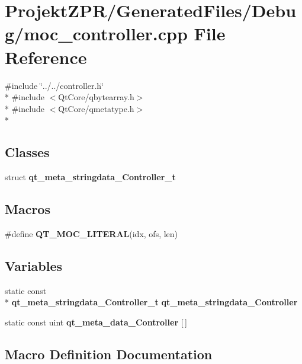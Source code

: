 \section{Projekt\-Z\-P\-R/\-Generated\-Files/\-Debug/moc\-\_\-controller.cpp File Reference}
\label{_debug_2moc__controller_8cpp}
{\ttfamily \#include \char`\"{}../../controller.\-h\char`\"{}}\\*
{\ttfamily \#include $<$Qt\-Core/qbytearray.\-h$>$}\\*
{\ttfamily \#include $<$Qt\-Core/qmetatype.\-h$>$}\\*
\subsection*{Classes}
\begin{DoxyCompactItemize}
\item 
struct {\bf qt\-\_\-meta\-\_\-stringdata\-\_\-\-Controller\-\_\-t}
\end{DoxyCompactItemize}
\subsection*{Macros}
\begin{DoxyCompactItemize}
\item 
\#define {\bf Q\-T\-\_\-\-M\-O\-C\-\_\-\-L\-I\-T\-E\-R\-A\-L}(idx, ofs, len)
\end{DoxyCompactItemize}
\subsection*{Variables}
\begin{DoxyCompactItemize}
\item 
static const \\*
{\bf qt\-\_\-meta\-\_\-stringdata\-\_\-\-Controller\-\_\-t} {\bf qt\-\_\-meta\-\_\-stringdata\-\_\-\-Controller}
\item 
static const uint {\bf qt\-\_\-meta\-\_\-data\-\_\-\-Controller} [$\,$]
\end{DoxyCompactItemize}


\subsection{Macro Definition Documentation}
